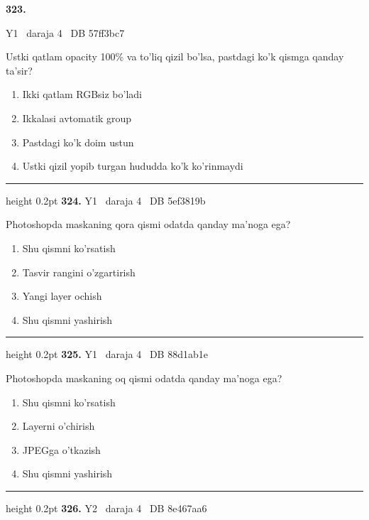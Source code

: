 \documentclass[10pt,a4paper,oneside]{article}
\begin{document}
\hypertarget{q323}{\textbf{\color{ink}323.}}  {\color{muted}\scriptsize Y1 \textbullet\ daraja 4 \textbullet\ DB 57ff3bc7}
\par
Ustki qatlam opacity 100\% va to'liq qizil bo'lsa, pastdagi ko'k qismga qanday ta'sir?
\begin{enumerate}[label=\Alph*),leftmargin=9mm]
\item Ikki qatlam RGBsiz bo'ladi
\item Ikkalasi avtomatik group
\item Pastdagi ko'k doim ustun
\item Ustki qizil yopib turgan hududda ko'k ko'rinmaydi
\end{enumerate}
\vspace{2mm}\hrule height 0.2pt \vspace{4mm}
\hypertarget{q324}{\textbf{\color{ink}324.}}  {\color{muted}\scriptsize Y1 \textbullet\ daraja 4 \textbullet\ DB 5ef3819b}
\par
Photoshopda maskaning qora qismi odatda qanday ma'noga ega?
\begin{enumerate}[label=\Alph*),leftmargin=9mm]
\item Shu qismni ko'rsatish
\item Tasvir rangini o'zgartirish
\item Yangi layer ochish
\item Shu qismni yashirish
\end{enumerate}
\vspace{2mm}\hrule height 0.2pt \vspace{4mm}
\hypertarget{q325}{\textbf{\color{ink}325.}}  {\color{muted}\scriptsize Y1 \textbullet\ daraja 4 \textbullet\ DB 88d1ab1e}
\par
Photoshopda maskaning oq qismi odatda qanday ma'noga ega?
\begin{enumerate}[label=\Alph*),leftmargin=9mm]
\item Shu qismni ko'rsatish
\item Layerni o'chirish
\item JPEGga o'tkazish
\item Shu qismni yashirish
\end{enumerate}
\vspace{2mm}\hrule height 0.2pt \vspace{4mm}
\hypertarget{q326}{\textbf{\color{ink}326.}}  {\color{muted}\scriptsize Y2 \textbullet\ daraja 4 \textbullet\ DB 8e467aa6}
\par
\end{document}
